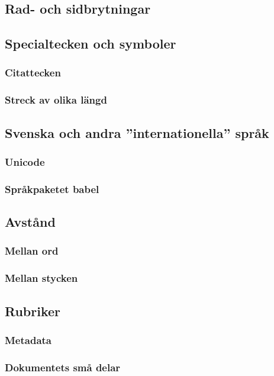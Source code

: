 \documentclass[swe,12pt]{skrapport}
\newcommand\pack[1]{\textsf{#1}}						%
\begin{document}
	\subsection{Rad- och sidbrytningar}
	
	\subsection{Specialtecken och symboler}
	\subsubsection{Citattecken}
	\subsubsection{Streck av olika längd}
	
	\subsection{Svenska och andra ''internationella'' språk}
	\subsubsection{Unicode}
	\subsubsection{Språkpaketet \pack{babel}}
	
	\subsection{Avstånd}
	\subsubsection{Mellan ord}
	\subsubsection{Mellan stycken}
	
	\subsection{Rubriker}
	\subsubsection{Metadata}
	\subsubsection{Dokumentets små delar}
	
\end{document}
